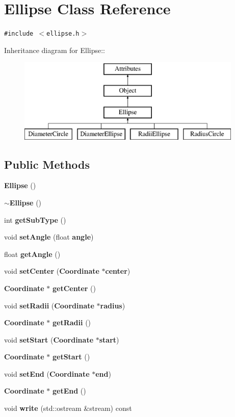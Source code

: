 \section{Ellipse Class Reference}
\label{classEllipse}
{\tt \#include $<$ellipse.h$>$}

Inheritance diagram for Ellipse::\begin{figure}[H]
\begin{center}
\leavevmode
\includegraphics[height=4cm]{classEllipse}
\end{center}
\end{figure}
\subsection*{Public Methods}
\begin{CompactItemize}
\item 
{\bf Ellipse} ()
\item 
{\bf $\sim$Ellipse} ()
\item 
int {\bf get\-Sub\-Type} ()
\item 
void {\bf set\-Angle} (float {\bf angle})
\item 
float {\bf get\-Angle} ()
\item 
void {\bf set\-Center} ({\bf Coordinate} $\ast${\bf center})
\item 
{\bf Coordinate} $\ast$ {\bf get\-Center} ()
\item 
void {\bf set\-Radii} ({\bf Coordinate} $\ast${\bf radius})
\item 
{\bf Coordinate} $\ast$ {\bf get\-Radii} ()
\item 
void {\bf set\-Start} ({\bf Coordinate} $\ast${\bf start})
\item 
{\bf Coordinate} $\ast$ {\bf get\-Start} ()
\item 
void {\bf set\-End} ({\bf Coordinate} $\ast${\bf end})
\item 
{\bf Coordinate} $\ast$ {\bf get\-End} ()
\item 
void {\bf write} (std::ostream \&stream) const
\end{CompactItemize}
